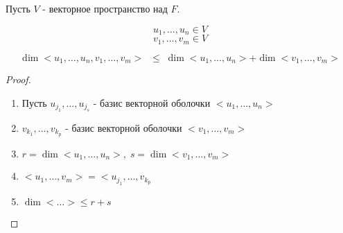 \bigskip


\begin{lemma}
    
    Пусть $V$ - векторное пространство над $F$. 
    
    $$u_1, \dots, u_n \in V$$
    $$v_1, \dots, v_m \in V$$
    
    $$\dim<u_1, \dots, u_n, v_1, \dots, v_m> \;\; \leq \; \dim<u_1, \dots, u_n> + \dim<v_1, \dots, v_m>$$

    \begin{proof}~

        \begin{enumerate}
            \item Пусть $u_{j_1}, \dots, u_{j_s}$ - базис векторной оболочки $<u_1, \dots, u_n>$
            \item $v_{k_1}, \dots, v_{k_p}$ - базис векторной оболочки $<v_1, \dots, v_m>$
            \item $r = \dim<u_1, \dots, u_n>, \; s = \dim<v_1, \dots, v_m>$
            \item $<u_1, \dots, v_m> = <u_{j_1}, \dots, v_{k_p}$
            \item $\dim< \dots > \leq r + s$
        \end{enumerate}
        
    \end{proof}

\end{lemma}


\bigskip


